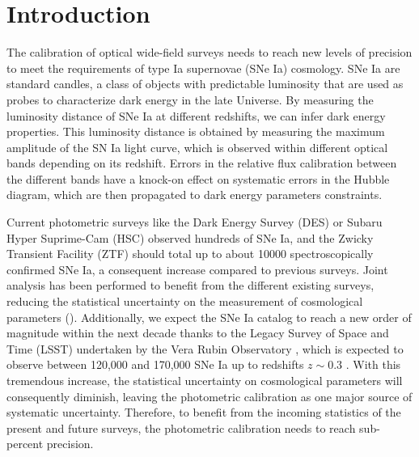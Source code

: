 \section{Introduction}

The calibration of optical wide-field surveys needs to reach new levels of precision to meet the requirements of type Ia supernovae (SNe Ia) cosmology. SNe Ia are standard candles, a class of objects with predictable luminosity that are used as probes to characterize dark energy in the late Universe. By measuring the luminosity distance of SNe Ia at different redshifts, we can infer dark energy properties. This luminosity distance is obtained by measuring the maximum amplitude of the SN Ia light curve, which is observed within different optical bands depending on its redshift. Errors in the relative flux calibration between the different bands have a knock-on effect on systematic errors in the Hubble diagram, which are then propagated to dark energy parameters constraints.

Current photometric surveys like the Dark Energy Survey (DES) \citep{Brout_2019} or Subaru Hyper Suprime-Cam (HSC) \citep{hsc_2019} observed hundreds of SNe Ia, and the Zwicky Transient Facility (ZTF) \citep{ztf_2022} should total up to about \num{10000} spectroscopically confirmed SNe Ia, a consequent increase compared to previous surveys. Joint analysis has been performed to benefit from the different existing surveys, reducing the statistical uncertainty on the measurement of cosmological parameters (\citealt{Betoule_2014,Scolnic_2018,Brout_2022,rubin2023union}). Additionally, we expect the SNe Ia catalog to reach a new order of magnitude within the next decade thanks to the Legacy Survey of Space and Time (LSST) undertaken by the Vera Rubin Observatory \citep{lsst}, which is expected to observe between 120,000 and 170,000 SNe Ia up to redshifts $z \sim 0.3$ \citep{lsst_2022}. With this tremendous increase, the statistical uncertainty on cosmological parameters will consequently diminish, leaving the photometric calibration as one major source of systematic uncertainty. Therefore, to benefit from the incoming statistics of the present and future surveys, the photometric calibration needs to reach sub-percent precision.

